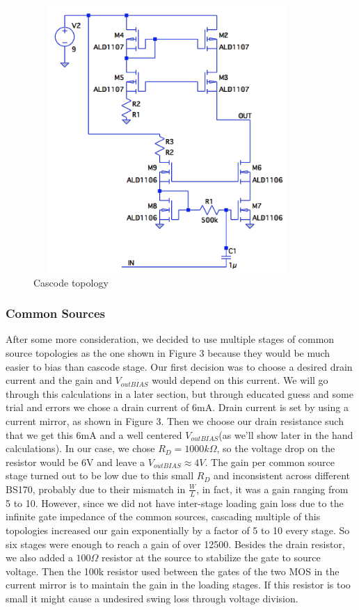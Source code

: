 \documentclass[11pt, twoside, letterpaper]{article}
\begin{document}
\begin{figure}[htbp]
\begin{center}
\includegraphics[width=4in,height=4in]{Cascode.png}
\caption{Cascode topology}
\end{center}
\end{figure}
\FloatBarrier

\subsubsection{Common Sources}
After some more consideration, we decided to use multiple stages of common source topologies as the one shown in Figure 3 because they would 
be much easier to bias than cascode stage. Our first decision was to choose a desired drain current and the gain and $V_{outBIAS}$
would depend on this current. We will go through this calculations in a later section, but through educated guess and some trial and errors we 
chose a drain current of 6mA. Drain current is set by using a current mirror, as shown in Figure 3. Then we choose our drain 
resistance such that we get this 6mA and a well centered $V_{outBIAS}$(as we'll show later in the hand calculations). In our case, we chose 
$R_D=1000k\Omega$, so the voltage drop on the resistor would be 6V and leave a $V_{outBIAS}\approx 4V$. The gain per common source stage turned 
out to be low due to this small $R_D$ and inconsistent across different BS170, probably due to their mismatch in $\frac{W}{L}$, in fact, it 
was a gain ranging from 5 to 10. However, since we did not have inter-stage loading gain loss due to the infinite gate impedance of the common 
sources, cascading multiple of this topologies increased our gain exponentially by a factor of 5 to 10 every stage. So six stages were enough 
to reach a gain of over 12500. Besides the drain resistor, we also added a $100\Omega$ resistor at the source to stabilize the gate to source voltage.
Then the 100k resistor used between the gates of the two MOS in the current mirror is to maintain the gain in the loading stages. If this resistor
is too small it might cause a undesired swing loss through voltage division.
\end{document}
